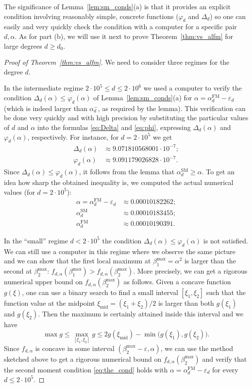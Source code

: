 \documentclass[12pt]{amsart}
\theoremstyle{definition}
\newcommand\al{\alpha}
\newcommand\be{\beta}
\newcommand\De{\Delta}
\newcommand\eps{\varepsilon}
\newcommand\alfm{\alpha^{\mathrm{FM}}}
\newcommand\alsm{\alpha^{\mathrm{SM}}}
\begin{document}
The significance of Lemma~\ref{lem:sm_conds}(a) is that it provides an explicit condition involving reasonably simple, concrete functions ($\varphi_d$ and $\De_{d}$) so one can easily and very quickly check the condition with a computer for a specific pair $d, \al$. As for part (b), we will use it next to prove Theorem~\ref{thm:vs_alfm} for large degrees $d \geq d_0$.
%
\begin{proof}[Proof of Theorem~\ref{thm:vs_alfm}]
We need to consider three regimes for the degree $d$.

In the intermediate regime $2\cdot 10^5 \leq d \leq 2\cdot 10^6$ we used a computer to verify the condition $\De_{d}(\al) \leq \varphi_d(\al)$ of Lemma~\ref{lem:sm_conds}(a) for $\al = \alfm_d-\eps_d$ (which is indeed larger than $\al_d^-$, as required by the lemma). This verification can be done very quickly and with high precision by substituting the particular values of $d$ and $\al$ into the formulas \eqref{eq:Delta} and \eqref{eq:phi}, expressing $\De_{d}(\al)$ and $\varphi_d(\al)$, respectively. For instance, for $d=2\cdot 10^5$ we get 
%
\begin{align*}
\De_{d}(\al) & \approx   9.071810568001 \cdot 10^{-7};\\
\varphi_d(\al) & \approx 9.091179026828 \cdot 10^{-7}.
\end{align*}
%
Since $\De_{d}(\al) \leq \varphi_d(\al)$, it follows from the lemma that $\alsm_d \geq \al$. To get an idea how sharp the obtained inequality is, we computed the actual numerical values (for $d=2\cdot 10^5$): 
%
\begin{align*}
\al = \alfm_d-\eps_d &\approx 0.00010182262 ;\\
\alsm_d &\approx              0.00010183455;\\
\alfm_d &\approx              0.00010190391.
\end{align*}
%

In the ``small'' regime $d<2\cdot 10^5$ the condition $\De_{d}(\al) \leq \varphi_d(\al)$ is not satisfied.
%
We can still use a computer in this regime where we observe the same picture and we can show that the first local maximum at $\be_1^{\max}=\al^2$ is larger than the second at $\be_2^{\max}$: $f_{d,\al}(\be_1^{\max})>f_{d,\al}(\be_2^{\max})$. 
More precisely, we can get a rigorous numerical upper bound on $f_{d,\al}(\be_2^{\max})$ as follows. Given a concave function $g(\xi)$, one can use a binary search to find a small interval $[\xi_1,\xi_2]$ such that the function value at the midpoint $\xi_{\textrm{mid}}=(\xi_1+\xi_2)/2$ is larger than both $g(\xi_1)$ and $g(\xi_2)$. Then the maximum is certainly attained inside this interval and we have 
%
\[ \max g 
\leq \max_{[\xi_1,\xi_2]} g 
\leq 2g(\xi_{\textrm{mid}})-\min \big( g(\xi_1), g(\xi_2) \big) .\] 
%
Since $f_{d,\al}$ is concave in some interval $(\be_2^{\max}-\eps,\al)$, we can use the method sketched above to get a rigorous numerical bound on $f_{d,\al}(\be_2^{\max})$ and verify that the second moment condition \eqref{eq:the_cond} holds with $\al=\alfm_d - \eps_d$ for every $d \leq 2 \cdot 10^5$.


\end{proof}
\end{document}
